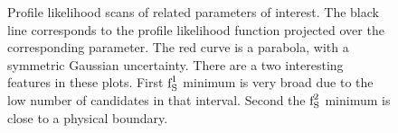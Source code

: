 \begin{figure}[!t]
  \centering
  \begin{subfigure}{0.5\textwidth}
    \raggedright
    \scalebox{0.54}{}
    \caption{}
    \label{nll_ASMag2_bin1}
  \end{subfigure}%
  \hfill%
  \begin{subfigure}{0.5\textwidth}
    \raggedleft
    \scalebox{0.54}{}
    \caption{}
    \label{nll_ASPhase_bin1}
  \end{subfigure}
  \begin{subfigure}{0.5\textwidth}
    \raggedright
    \scalebox{0.54}{}
    \caption{}
    \label{nll_ASMag2_bin2}
  \end{subfigure}%
  \hfill%
  \begin{subfigure}{0.5\textwidth}
    \raggedleft
    \scalebox{0.54}{}
    \caption{}
    \label{nll_ASPhase_bin2}
  \end{subfigure}
  \caption{Profile likelihood scans of \swave related parameters of interest. The black line corresponds to the profile likelihood
         function projected over the corresponding parameter. The red curve is a parabola, with a symmetric Gaussian
         uncertainty. There are a two interesting features in these plots. First $\text{f}_{\text{S}}^{1}$ minimum is very broad due to the
         low number of candidates in that \mkpi interval. Second the $\text{f}_{\text{S}}^{2}$ minimum is close to a physical boundary.}
\end{figure}


